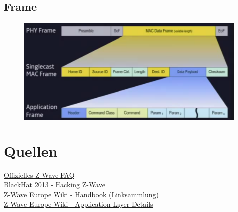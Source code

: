 \documentclass[a4paper,11pt]{article}
\begin{document}
\subsection*{Frame}
\begin{figure}[h!t]
	\includegraphics{images/frame.png}
\end{figure}

\section*{Quellen}

\href{http://www.z-wave.com/faq}{Offizielles Z-Wave FAQ}\\
\href{https://www.youtube.com/watch?v=KYaEQhvodc8}{BlackHat 2013 - Hacking Z-Wave}\\
\href{http://wiki.zwaveeurope.com/index.php?title=Z-Wave_Technical_Handbook}{Z-Wave Europe Wiki - Handbook (Linksammlung)}\\
\href{http://wiki.zwaveeurope.com/index.php?title=Z-Wave_Application_Layer}{Z-Wave Europe Wiki - Application Layer Details}
\end{document}
